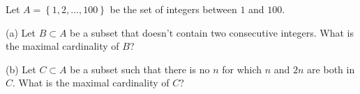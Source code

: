 \begin{problem}
    Let \( A = \left\{1, 2, \ldots, 100\right\} \) be the set of integers between \( 1 \) and \( 100 \).

    (a) Let \( B \subset A \) be a subset that doesn't contain two consecutive integers. What is the maximal cardinality of \( B \)?

    (b) Let \( C \subset A \) be a subset such that there is no \( n \) for which \( n \) and \( 2n \) are both in \( C \). What is the maximal cardinality of \( C \)?
\end{problem}

